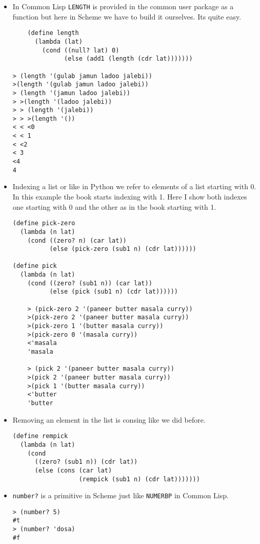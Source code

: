 \documentclass[11pt]{article}
\begin{document}
\begin{itemize}
\begin{verbatim}
\end{verbatim}

\item In Common Lisp \texttt{LENGTH} is provided in the common user package as a function but here in Scheme we have to build it ourselves. Its quite easy.
\begin{verbatim}
    (define length
      (lambda (lat)
        (cond ((null? lat) 0)
              (else (add1 (length (cdr lat)))))))

> (length '(gulab jamun ladoo jalebi))
>(length '(gulab jamun ladoo jalebi))
> (length '(jamun ladoo jalebi))
> >(length '(ladoo jalebi))
> > (length '(jalebi))
> > >(length '())
< < <0
< < 1
< <2
< 3
<4
4

\end{verbatim}

\item Indexing a list or like in Python we refer to elements of a list starting with 0. In this example the book starts indexing with 1. Here I show
both indexes one starting with 0 and the other as in the book starting with 1.
\begin{verbatim}
(define pick-zero
  (lambda (n lat)
    (cond ((zero? n) (car lat))
          (else (pick-zero (sub1 n) (cdr lat))))))

(define pick
  (lambda (n lat)
    (cond ((zero? (sub1 n)) (car lat))
          (else (pick (sub1 n) (cdr lat))))))

    > (pick-zero 2 '(paneer butter masala curry))
    >(pick-zero 2 '(paneer butter masala curry))
    >(pick-zero 1 '(butter masala curry))
    >(pick-zero 0 '(masala curry))
    <'masala
    'masala

    > (pick 2 '(paneer butter masala curry))
    >(pick 2 '(paneer butter masala curry))
    >(pick 1 '(butter masala curry))
    <'butter
    'butter
\end{verbatim}

\item Removing an element in the list is consing like we did before.
\begin{verbatim}
(define rempick
  (lambda (n lat)
    (cond
      ((zero? (sub1 n)) (cdr lat))
      (else (cons (car lat)
                  (rempick (sub1 n) (cdr lat)))))))

\end{verbatim}

\item \texttt{number?} is a primitive in Scheme just like \texttt{NUMERBP} in Common Lisp.
\begin{verbatim}
> (number? 5)
#t
> (number? 'dosa)
#f


\end{verbatim}
\end{itemize}
\end{document}
